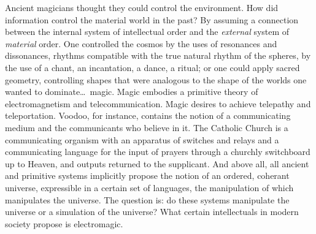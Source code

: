 Ancient magicians thought they could
control the environment. How did information 
control the material world in the past?
By assuming a connection between the 
internal system of intellectual order and the 
\emph{external} system of \emph{material} order. One 
controlled the cosmos by the uses of resonances
and dissonances, rhythms compatible with
the true natural rhythm of the spheres, by the
use of a chant, an incantation, a dance, a 
ritual; or one could apply sacred geometry,
controlling shapes that were analogous to
the shape of the worlds one wanted to dominate\ldots\ magic. Magic embodies a primitive
theory of electromagnetism and telecommunication. 
Magic desires to achieve telepathy
and teleportation. Voodoo, for instance, contains 
the notion of a communicating medium
and the communicants who believe in it.
The Catholic Church is a communicating
organism with an apparatus of switches and
relays and a communicating language for
the input of prayers through a churchly
switchboard up to Heaven, and outputs returned 
to the supplicant. And above all, all
ancient and primitive systems implicitly
propose the notion of an ordered, coherant
universe, expressible in a certain set of languages,
the manipulation of which manipulates 
the universe. The question is: do these
systems manipulate the universe or a simulation 
of the universe? What certain intellectuals 
in modern society propose is electromagic.

